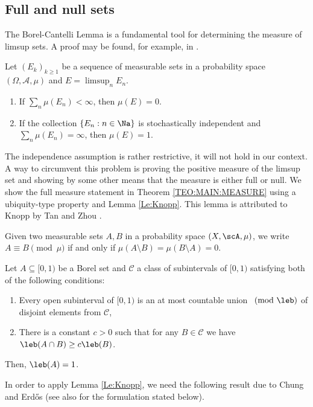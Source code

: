 \documentclass[12pt,a4paper]{amsart}
\begin{document}
\subsection{Full and null sets}

The Borel-Cantelli Lemma is a fundamental tool for determining the measure of limsup sets. A proof may be found, for example, in \cite[Lemma 4.18]{KallenbergBook2021}. 

\begin{teo01}\label{Le:BorelCantelli}
Let $(E_k)_{k\geq 1}$ be a sequence of measurable sets in a probability space $(\Omega,\mathscr{A},\mu)$ and $E=\limsup_n E_n$. 
\begin{enumerate}[\rm (i).]
\item If $\sum_{n}\mu(E_n)<\infty$, then $\mu(E)=0$.
\item If the collection $\{E_n:n\in\Na\}$ is stochastically independent and $\sum_{n}\mu(E_n)=\infty$, then $\mu(E)=1$.
\end{enumerate}
\end{teo01}
The independence assumption is rather restrictive, it will not hold in our context. A way to circumvent this problem is proving the positive measure of the limsup set and showing by some other means that the measure is either full or null. We show the full measure statement in Theorem \ref{TEO:MAIN:MEASURE} using a ubiquity-type property and Lemma \ref{Le:Knopp}. This lemma is attributed to Knopp \cite{Knopp1926} by Tan and Zhou \cite{TanZhou2024}. 

Given two measurable sets $A,B$ in a probability space $(X,\scA,\mu)$, we write $A \equiv B \pmod \mu$ if and only if $\mu(A\setminus B)=\mu(B\setminus A)=0$.

\begin{lem01}\label{Le:Knopp}
Let $A \subseteq [0,1)$ be a Borel set and $\mathcal{C}$ a class of subintervals of $[0, 1)$ satisfying both of the following conditions:
    \begin{enumerate}
        \item Every open subinterval of $[0,1)$ is an at most countable union $\pmod \leb$ of disjoint elements from $\mathcal{C}$,
        \item There is a constant $c>0$ such that for any $B \in \mathcal{C}$ we have $\leb (A\cap B) \geq c \leb(B)$.
    \end{enumerate}
    Then, $\leb(A)=1$.
\end{lem01}

In order to apply Lemma \ref{Le:Knopp}, we need the following result due to Chung and Erd{\H o}s \cite{ChungErdos1952} (see also \cite[Lemma 6]{Sprindzuk1979} for the formulation stated below).
\end{document}

